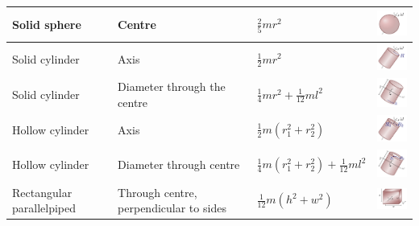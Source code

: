 \documentclass[12pt,a4paper]{article}
\begin{document}
\begin{tabular}{l|llc}
	Solid sphere & Centre & \( \frac{2}{5} m r^2 \) &\includegraphics[width=2cm]{page0010.pdf}\\
	\hline
	
	Solid cylinder & Axis & \( \frac{1}{2} m r^2 \) &\includegraphics[width=2cm]{page0007.pdf}\\
	\hline
	
	Solid cylinder & Diameter through the centre& \( \frac{1}{4}m r^2 + \frac{1}{12}m l^2\) &\includegraphics[width=2cm]{moiSolidSphereDiam.pdf}\\
	\hline
	
	Hollow cylinder & Axis & \( \frac{1}{2}m (r_1^2+ r_2^2) \) &\includegraphics[width=2cm]{page0008.pdf}\\
	\hline
	
	Hollow cylinder & Diameter through centre & \( \frac{1}{4}m (r_1^2+ r_2^2) + \frac{1}{12}ml^2 \) &\includegraphics[width=2cm]{moiHollowSphereDiam.pdf}\\
	\hline
	
	Rectangular parallelpiped & Through centre, perpendicular to sides & \( \frac{1}{12} m (h^2 + w^2) \) &\includegraphics[width=2cm]{parallelpiped.pdf}\\
	
\end{tabular}
\end{document}
